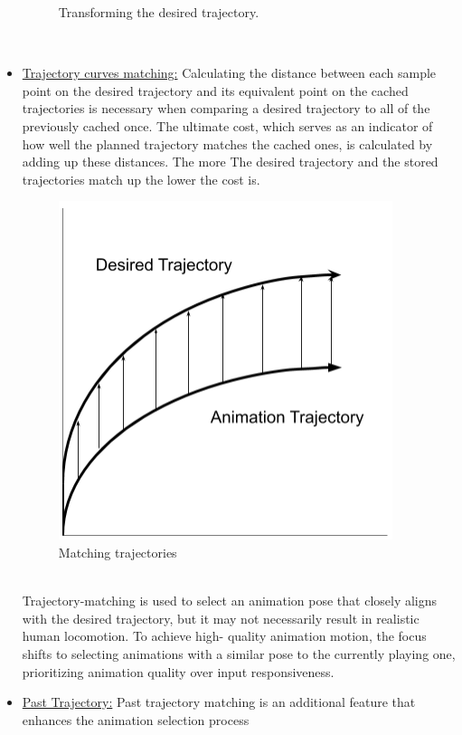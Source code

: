 \documentclass[12pt]{book}
\begin{document}
\begin{itemize}
\begin{figure}[!h]
              \caption{Transforming the desired trajectory.}
              \label{Transforming the desired trajectory.}
          \end{figure}\\
    \item \underline{Trajectory curves matching:}
          Calculating the distance between each sample point on the desired trajectory and its equivalent
          point on the cached trajectories is necessary when comparing a desired trajectory to all of the
          previously cached once. The ultimate cost, which serves as an indicator of how well the planned
          trajectory matches the cached ones, is calculated by adding up these distances. The more The
          desired trajectory and the stored trajectories match up the lower the cost is.
          \begin{figure}[!h]
              \centering
              \includegraphics[scale=0.7]{./Figures/Images/TrajectoryMatch.jpg}
              \caption{Matching trajectories}
              \label{Matching trajectories}
          \end{figure}\\
          Trajectory-matching is used to select an animation pose that closely aligns with the desired
          trajectory, but it may not necessarily result in realistic human locomotion. To achieve high-
          quality animation motion, the focus shifts to selecting animations with a similar pose to the
          currently playing one, prioritizing animation quality over input responsiveness.
    \item \underline{Past Trajectory:}
          Past trajectory matching is an additional feature that enhances the animation selection process

\end{itemize}
\end{document}
